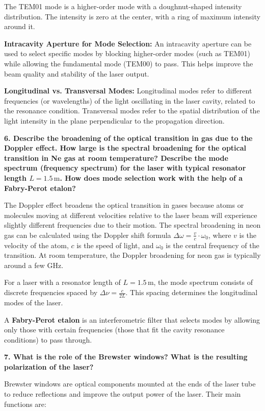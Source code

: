 \documentclass{article}
\begin{document}
The TEM01 mode is a higher-order mode with a doughnut-shaped intensity distribution. The intensity is zero at the center, with a ring of maximum intensity around it.

\textbf{Intracavity Aperture for Mode Selection:} An intracavity aperture can be used to select specific modes by blocking higher-order modes (such as TEM01) while allowing the fundamental mode (TEM00) to pass. This helps improve the beam quality and stability of the laser output.

\textbf{Longitudinal vs. Transversal Modes:} Longitudinal modes refer to different frequencies (or wavelengths) of the light oscillating in the laser cavity, related to the resonance condition. Transversal modes refer to the spatial distribution of the light intensity in the plane perpendicular to the propagation direction.

\textbf{6. Describe the broadening of the optical transition in gas due to the Doppler effect. How large is the spectral broadening for the optical transition in Ne gas at room temperature? Describe the mode spectrum (frequency spectrum) for the laser with typical resonator length \( L = 1.5 \, \text{m} \). How does mode selection work with the help of a Fabry-Perot etalon?}

The Doppler effect broadens the optical transition in gases because atoms or molecules moving at different velocities relative to the laser beam will experience slightly different frequencies due to their motion. The spectral broadening in neon gas can be calculated using the Doppler shift formula \( \Delta \omega = \frac{v}{c} \cdot \omega_0 \), where \( v \) is the velocity of the atom, \( c \) is the speed of light, and \( \omega_0 \) is the central frequency of the transition. At room temperature, the Doppler broadening for neon gas is typically around a few GHz.

For a laser with a resonator length of \( L = 1.5 \, \text{m} \), the mode spectrum consists of discrete frequencies spaced by \( \Delta \nu = \frac{c}{2L} \). This spacing determines the longitudinal modes of the laser.

A \textbf{Fabry-Perot etalon} is an interferometric filter that selects modes by allowing only those with certain frequencies (those that fit the cavity resonance conditions) to pass through.

\textbf{7. What is the role of the Brewster windows? What is the resulting polarization of the laser?}

Brewster windows are optical components mounted at the ends of the laser tube to reduce reflections and improve the output power of the laser. Their main functions are:
\end{document}
